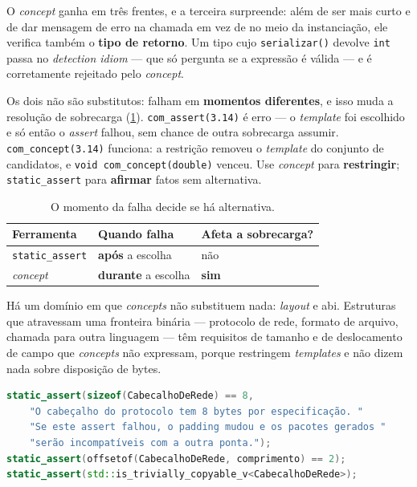 O \emph{concept} ganha em três frentes, e a terceira surpreende: além de ser
mais curto e de dar mensagem de erro na chamada em vez de no meio da
instanciação, ele verifica também o \textbf{tipo de retorno}. Um tipo cujo
\texttt{serializar()} devolve \texttt{int} passa no \emph{detection idiom} ---
que só pergunta se a expressão é válida --- e é corretamente rejeitado pelo
\emph{concept}.

Os dois não são substitutos: falham em \textbf{momentos diferentes}, e isso muda
a resolução de sobrecarga (\cref{tab:assert-concept}).
\texttt{com\_assert(3.14)} é erro --- o \emph{template} foi escolhido e só então
o \emph{assert} falhou, sem chance de outra sobrecarga assumir.
\texttt{com\_concept(3.14)} funciona: a restrição removeu o \emph{template} do
conjunto de candidatos, e \texttt{void com\_concept(double)} venceu. Use
\emph{concept} para \textbf{restringir}; \texttt{static\_assert} para
\textbf{afirmar} fatos sem alternativa.

\begin{table}[htbp]
\centering
\caption{O momento da falha decide se há alternativa.}
\label{tab:assert-concept}
\footnotesize
\begin{tabular}{@{}lll@{}}
\toprule
\textbf{Ferramenta} & \textbf{Quando falha} & \textbf{Afeta a sobrecarga?} \\
\midrule
\texttt{static\_assert} & \textbf{após} a escolha    & não \\
\emph{concept}          & \textbf{durante} a escolha & \textbf{sim} \\
\bottomrule
\end{tabular}
\end{table}

Há um domínio em que \emph{concepts} não substituem nada: \emph{layout} e
\gls{abi}. Estruturas que atravessam uma fronteira binária --- protocolo de
rede, formato de arquivo, chamada para outra linguagem --- têm requisitos de
tamanho e de deslocamento de campo que \emph{concepts} não expressam, porque
restringem \emph{templates} e não dizem nada sobre disposição de bytes.

\begin{lstlisting}[style=bt, language=C++,
    caption={O contrato do protocolo, verificado no \emph{build}.}]
static_assert(sizeof(CabecalhoDeRede) == 8,
    "O cabeçalho do protocolo tem 8 bytes por especificação. "
    "Se este assert falhou, o padding mudou e os pacotes gerados "
    "serão incompatíveis com a outra ponta.");
static_assert(offsetof(CabecalhoDeRede, comprimento) == 2);
static_assert(std::is_trivially_copyable_v<CabecalhoDeRede>);
\end{lstlisting}

